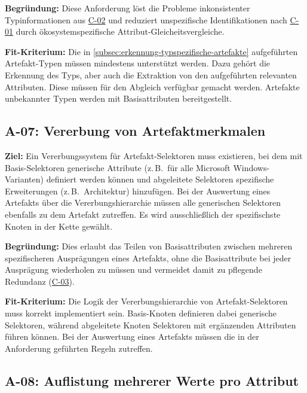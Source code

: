 \textbf{Begründung:}
Diese Anforderung löst die Probleme inkonsistenter Typinformationen aus \hyperref[subsec:c-02-uneindeutige-artefakt-typinformation]{C-02} und reduziert unspezifische Identifikationen nach \hyperref[subsec:c-01-unspezifische-identifikation-von-artefakten]{C-01} durch ökosystemspezifische Attribut-Gleicheitsvergleiche.

\textbf{Fit-Kriterium:}
Die in \autoref{subsec:erkennung-typspezifische-artefakte} aufgeführten Artefakt-Typen müssen mindestens unterstützt werden.
Dazu gehört die Erkennung des Typs, aber auch die Extraktion von den aufgeführten relevanten Attributen.
Diese müssen für den Abgleich verfügbar gemacht werden.
Artefakte unbekannter Typen werden mit Basisattributen bereitgestellt.

\subsection{A-07: Vererbung von Artefaktmerkmalen}\label{subsec:req-selektor-inheritance}

\textbf{Ziel:}
Ein Vererbungssystem für Artefakt-Selektoren muss existieren, bei dem mit Basis-Selektoren generische Attribute (z.\,B.\ für alle Microsoft Windows-Varianten) definiert werden können und abgeleitete Selektoren spezifische Erweiterungen (z.\,B.\ Architektur) hinzufügen.
Bei der Auswertung eines Artefakts über die Vererbungshierarchie müssen alle generischen Selektoren ebenfalls zu dem Artefakt zutreffen.
Es wird ausschließlich der spezifischste Knoten in der Kette gewählt.

\textbf{Begründung:}
Dies erlaubt das Teilen von Basisattributen zwischen mehreren spezifischeren Ausprägungen eines Artefakts, ohne die Basisattribute bei jeder Ausprägung wiederholen zu müssen und vermeidet damit zu pflegende Redundanz (\hyperref[subsec:c-03-duplizierte-artefakt-selektoren]{C-03}).

\textbf{Fit-Kriterium:}
Die Logik der Vererbungshierarchie von Artefakt-Selektoren muss korrekt implementiert sein.
Basis-Knoten definieren dabei generische Selektoren, während abgeleitete Knoten Selektoren mit ergänzenden Attributen führen können.
Bei der Auswertung eines Artefakts müssen die in der Anforderung geführten Regeln zutreffen.

\subsection{A-08: Auflistung mehrerer Werte pro Attribut}\label{subsec:req-multiple-attribute-values}

